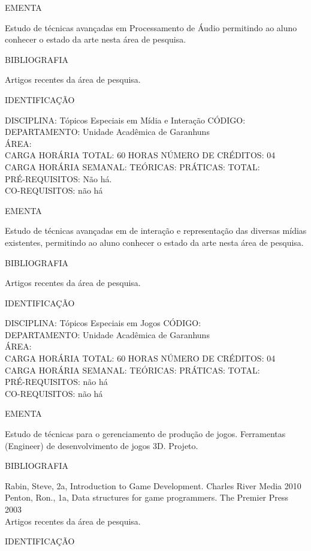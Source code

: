 \documentclass[
	12pt,				%
	openright,			%
  oneside,     %
	a4paper,			%
	chapter=TITLE,		%
	english,			%
	french,				%
	spanish,			%
	brazil				%
	]{abntex2}
\begin{document}
\begin{apendicesenv}
EMENTA 

Estudo de técnicas avançadas em Processamento de Áudio permitindo ao
aluno conhecer o estado da arte nesta área de pesquisa.

BIBLIOGRAFIA 

Artigos recentes da área de pesquisa.

\newpage IDENTIFICAÇÃO

DISCIPLINA: Tópicos Especiais em Mídia e Interação CÓDIGO:\\ 
DEPARTAMENTO: Unidade Acadêmica de Garanhuns\\
ÁREA: \\
CARGA HORÁRIA TOTAL: 60 HORAS NÚMERO DE CRÉDITOS: 04\\
CARGA HORÁRIA SEMANAL: TEÓRICAS: PRÁTICAS: TOTAL: \\
PRÉ-REQUISITOS: Não há.\\
CO-REQUISITOS: não há

EMENTA 

Estudo de técnicas avançadas em de interação e representação das
diversas mídias existentes, permitindo ao aluno conhecer o estado da
arte nesta área de pesquisa.

BIBLIOGRAFIA 

Artigos recentes da área de pesquisa.

\newpage IDENTIFICAÇÃO

DISCIPLINA: Tópicos Especiais em Jogos CÓDIGO:\\ 
DEPARTAMENTO: Unidade Acadêmica de Garanhuns\\
ÁREA: \\
CARGA HORÁRIA TOTAL: 60 HORAS NÚMERO DE CRÉDITOS: 04\\
CARGA HORÁRIA SEMANAL: TEÓRICAS: PRÁTICAS: TOTAL: \\
PRÉ-REQUISITOS: não há\\
CO-REQUISITOS: não há

EMENTA 

Estudo de técnicas para o gerenciamento de produção de jogos.
Ferramentas (Engineer) de desenvolvimento de jogos 3D. Projeto.

BIBLIOGRAFIA 

Rabin, Steve, 2a, Introduction to Game Development. Charles River Media
2010\\
Penton, Ron., 1a, Data structures for game programmers. The Premier
Press 2003\\
Artigos recentes da área de pesquisa.

\newpage IDENTIFICAÇÃO


\end{apendicesenv}
\end{document}
